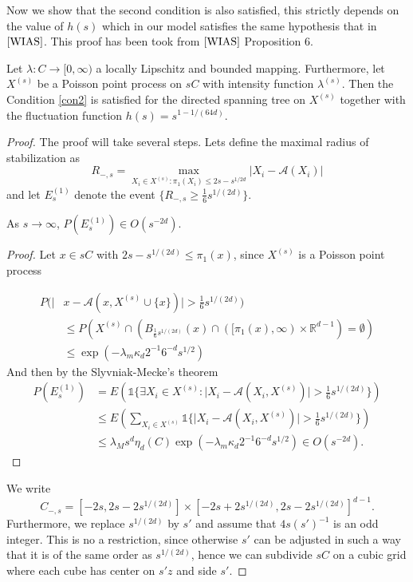 Now we show that the second condition is also satisfied, this strictly depends on the value of $h(s)$ which in our model satisfies the same hypothesis that in $\cite{WIAS}$. This proof has been took from $\cite{WIAS}$ Proposition 6.
\begin{prop}
Let $\lambda: C\rightarrow [0,\infty)$ a locally Lipschitz  and bounded mapping. Furthermore, let $X^{(s)}$ be a Poisson point process on $sC$ with intensity function $\lambda^{(s)}$. Then the Condition \ref{con2} is satisfied for the directed spanning tree on $X^{(s)}$ together with the fluctuation function $h(s)=s^{1-1/(64d)}$.
\end{prop}
\begin{proof}
The proof will take several steps. Lets define the maximal radius of stabilization as $$R_{-,s}=\max_{X_{i}\in X^{(s)}:\pi_1(X_i)\leq 2s-s^{1/2d}}\vert X_i-\mathcal{A}(X_i)\vert $$ and let $E_s^{(1)}$ denote the event $\lbrace R_{-,s}\geq \frac{1}{6} s^{1/(2d)}\rbrace$.
\begin{lem}\label{lem2.6} As $s\rightarrow\infty$, $P(E^{(1)}_s)\in O(s^{-2d})$.
\end{lem}
\begin{proof}
Let $x\in sC$ with $2s-s^{1/(2d)}\leq \pi_1(x)$, since $X^{(s)}$ is a Poisson point process 

\begin{align}
P(\vert &x-\mathcal{A}(x, X^{(s)}\cup\lbrace x\rbrace)\vert >\frac{1}{6} s^{1/(2d)})\nonumber\\&\leq P(X^{(s)}\cap(B_{\frac{1}{6} s^{1/(2d)}}(x)\cap([\pi_1(x), \infty)\times \mathbb{R}^{d-1})=\emptyset)\nonumber\\
&\leq \exp(-\lambda_m \kappa_d 2^{-1}6^{-d}s^{1/2})\nonumber
\end{align}
\normalsize
And then by the Slyvniak-Mecke's theorem
\begin{align}
P(E^{(1)}_s)&=E(\mathds{1}\lbrace \exists X_i\in X^{(s)}:\vert X_i-\mathcal{A}(X_i, X^{(s)})\vert >\frac{1}{6} s^{1/(2d)}\rbrace) \nonumber\\
&\leq E(\sum_{X_i\in X^{(s)}}\mathds{1}\lbrace\vert X_i-\mathcal{A}(X_i, X^{(s)})\vert>\frac{1}{6} s^{1/(2d)}\rbrace) \nonumber\\
&\leq  \lambda_M s^d \eta_d(C)\exp(-\lambda_m \kappa_d 2^{-1}6^{-d}s^{1/2})\in O(s^{-2d}).\nonumber
\end{align}

\end{proof}
We write $$C_{-,s}=[-2s,2s-2s^{1/(2d)}]\times[-2s+2s^{1/(2d)},2s-2s^{1/(2d)}]^{d-1}.$$
Furthermore, we replace $s^{1/(2d)}$ by $s'$ and assume that $4s(s')^{-1}$ is an odd integer. This is no a restriction, since otherwise $s'$ can be adjusted in such a way that it is of the same order as $s^{1/(2d)}$, hence we can subdivide $sC$ on a cubic grid where each cube has center on $s'z$ and side $s'$.


\end{proof}
